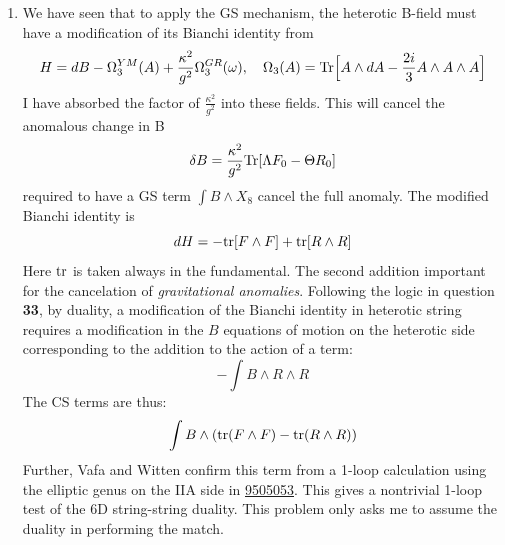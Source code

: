 \documentclass[11pt, class=article, crop=false]{standalone}
\begin{document}
\begin{enumerate}
	\textbf{Could we not have just exhibited a 3 Killing spinors? Are there such? In any case, this was more instructive}
	
	Lastly, to see the asymptotic limit, we can take the $x_i$ to collide. At a distance, $V$ will look like $\frac{N}{r}$. This corresponds to an $F$ with $N$ units of flux asymptotically. The circle bundle over the $\RR^3$ will asymptotically looks like an $S^1$ fibration over $S^2$. For $N = 1$, this is simply the Hopf fibration. For higher $N$, the connection is $N$ times larger, which makes the $U(1)$ circle $N$ times smaller, and corresponds to a fiberwise quotient of $S^3 \to S^2$ by $\ZZ_N$.
	
	\textbf{Did Kiritsis mean to write $N$?}
	

	\item We have seen that to apply the GS mechanism, the heterotic B-field must have a modification of its Bianchi identity from
	\[
		H = dB - \Omega_3^{YM}(A) + \frac{\kappa^2}{g^2} \Omega_3^{GR}(\omega), \quad \Omega_3(A) = \mathrm{Tr} \Big[A \wedge dA - \frac{2i}3 A \wedge A \wedge A\Big]
	\]
	I have absorbed the factor of $\frac{\kappa^2}{g^2}$ into these fields. This will cancel the anomalous change in B
	\[
		\delta B = \frac{\kappa^2}{g^2} \mathrm{Tr}[\Lambda F_0 - \Theta R_0]
	\]
	required to have a GS term $\int B \wedge X_8$ cancel the full anomaly. The modified Bianchi identity is
	\[
		dH = -\mathrm{tr}[F \wedge F] + \mathrm{tr}[R \wedge R]
	\]
	Here $\mathrm{tr}$ is taken always in the fundamental. The second addition important for the cancelation of \emph{gravitational anomalies}.
	Following the logic in question \textbf{33}, by duality, a modification of the Bianchi identity in heterotic string requires a modification in the $B$ equations of motion on the heterotic side corresponding to the addition to the action of a term:
	\[
		-\int B \wedge R \wedge R
	\]
	The CS terms are thus:
	\[
		\int B \wedge (\mathrm{tr}(F \wedge F) - \mathrm{tr}(R \wedge R))
	\]
	 Further, Vafa and Witten confirm this term from a 1-loop calculation using the elliptic genus on the IIA side in \href{https://arxiv.org/pdf/hep-th/9505053.pdf}{9505053}. This gives a nontrivial 1-loop test of the 6D string-string duality. This problem only asks me to assume the duality in performing the match.
	

\end{enumerate}
\end{document}
